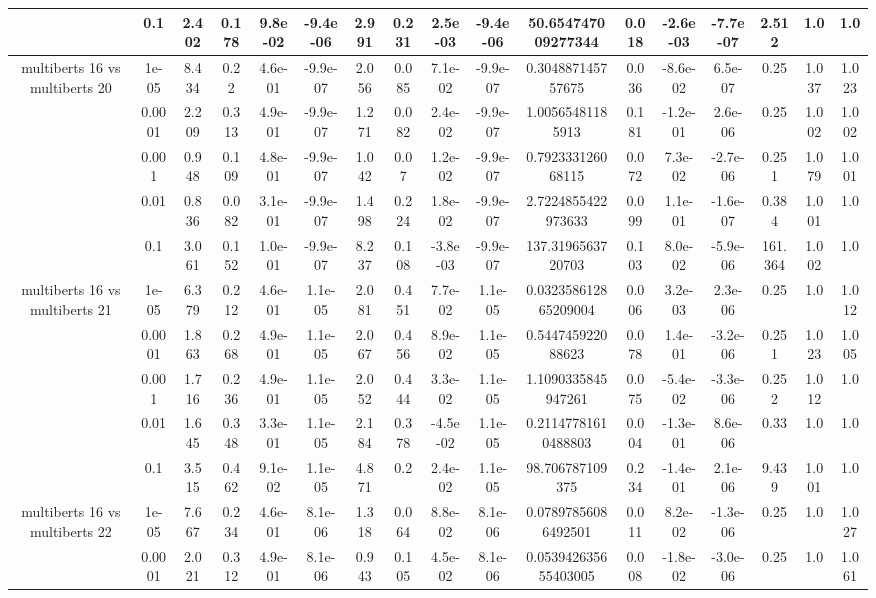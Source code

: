 \begin{tabular}{|c|c|c|c|c|c|c|c|c|c|c|c|c|c|c|c|c|}
 & 0.1 & 2.402 & 0.178 & 9.8e-02 & -9.4e-06 & 2.991 & 0.231 & 2.5e-03 & -9.4e-06 & 50.654747009277344 & 0.018 & -2.6e-03 & -7.7e-07 & 2.512 & 1.0 & 1.0 \\
\hline
\multirow{5}{*}{multiberts 16 vs multiberts 20} & 1e-05 & 8.434 & 0.22 & 4.6e-01 & -9.9e-07 & 2.056 & 0.085 & 7.1e-02 & -9.9e-07 & 0.304887145757675 & 0.036 & -8.6e-02 & 6.5e-07 & 0.25 & 1.037 & 1.023 \\
 & 0.0001 & 2.209 & 0.313 & 4.9e-01 & -9.9e-07 & 1.271 & 0.082 & 2.4e-02 & -9.9e-07 & 1.00565481185913 & 0.181 & -1.2e-01 & 2.6e-06 & 0.25 & 1.002 & 1.002 \\
 & 0.001 & 0.948 & 0.109 & 4.8e-01 & -9.9e-07 & 1.042 & 0.07 & 1.2e-02 & -9.9e-07 & 0.792333126068115 & 0.072 & 7.3e-02 & -2.7e-06 & 0.251 & 1.079 & 1.001 \\
 & 0.01 & 0.836 & 0.082 & 3.1e-01 & -9.9e-07 & 1.498 & 0.224 & 1.8e-02 & -9.9e-07 & 2.7224855422973633 & 0.099 & 1.1e-01 & -1.6e-07 & 0.384 & 1.001 & 1.0 \\
 & 0.1 & 3.061 & 0.152 & 1.0e-01 & -9.9e-07 & 8.237 & 0.108 & -3.8e-03 & -9.9e-07 & 137.3196563720703 & 0.103 & 8.0e-02 & -5.9e-06 & 161.364 & 1.002 & 1.0 \\
\hline
\multirow{5}{*}{multiberts 16 vs multiberts 21} & 1e-05 & 6.379 & 0.212 & 4.6e-01 & 1.1e-05 & 2.081 & 0.451 & 7.7e-02 & 1.1e-05 & 0.032358612865209004 & 0.006 & 3.2e-03 & 2.3e-06 & 0.25 & 1.0 & 1.012 \\
 & 0.0001 & 1.863 & 0.268 & 4.9e-01 & 1.1e-05 & 2.067 & 0.456 & 8.9e-02 & 1.1e-05 & 0.544745922088623 & 0.078 & 1.4e-01 & -3.2e-06 & 0.251 & 1.023 & 1.005 \\
 & 0.001 & 1.716 & 0.236 & 4.9e-01 & 1.1e-05 & 2.052 & 0.444 & 3.3e-02 & 1.1e-05 & 1.1090335845947261 & 0.075 & -5.4e-02 & -3.3e-06 & 0.252 & 1.012 & 1.0 \\
 & 0.01 & 1.645 & 0.348 & 3.3e-01 & 1.1e-05 & 2.184 & 0.378 & -4.5e-02 & 1.1e-05 & 0.21147781610488803 & 0.004 & -1.3e-01 & 8.6e-06 & 0.33 & 1.0 & 1.0 \\
 & 0.1 & 3.515 & 0.462 & 9.1e-02 & 1.1e-05 & 4.871 & 0.2 & 2.4e-02 & 1.1e-05 & 98.706787109375 & 0.234 & -1.4e-01 & 2.1e-06 & 9.439 & 1.001 & 1.0 \\
\hline
\multirow{5}{*}{multiberts 16 vs multiberts 22} & 1e-05 & 7.667 & 0.234 & 4.6e-01 & 8.1e-06 & 1.318 & 0.064 & 8.8e-02 & 8.1e-06 & 0.07897856086492501 & 0.011 & 8.2e-02 & -1.3e-06 & 0.25 & 1.0 & 1.027 \\
 & 0.0001 & 2.021 & 0.312 & 4.9e-01 & 8.1e-06 & 0.943 & 0.105 & 4.5e-02 & 8.1e-06 & 0.053942635655403005 & 0.008 & -1.8e-02 & -3.0e-06 & 0.25 & 1.0 & 1.061 \\

\end{tabular}
